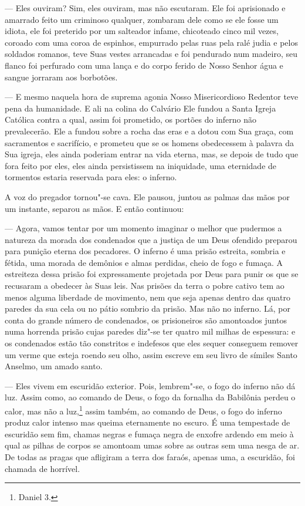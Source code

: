  --- Eles ouviram? Sim, eles ouviram, mas não escutaram. Ele foi
aprisionado e amarrado feito um criminoso qualquer, zombaram dele como
se ele fosse um idiota, ele foi preterido por um salteador infame,
chicoteado cinco mil vezes, coroado com uma coroa de espinhos,
empurrado pelas ruas pela ralé judia e pelos soldados romanos, teve
Suas vestes arrancadas e foi pendurado num madeiro, seu flanco foi
perfurado com uma lança e do corpo ferido de Nosso Senhor água e sangue
jorraram aos borbotões.

 --- E mesmo naquela hora de suprema agonia Nosso Misericordioso Redentor
 teve pena da humanidade. E ali na colina do Calvário Ele fundou a Santa
 Igreja Católica contra a qual, assim foi prometido, os portões do
inferno não prevalecerão. Ele a fundou sobre a rocha das eras e a dotou
com Sua graça, com sacramentos e sacrifício, e prometeu que se os
homens obedecessem à palavra da Sua igreja, eles ainda poderiam entrar
na vida eterna, mas, se depois de tudo que fora feito por eles, eles
ainda persistissem na iniquidade, uma eternidade de tormentos estaria
reservada para eles: o inferno.

A voz do pregador tornou"-se cava. Ele pausou, juntou as palmas das mãos
por um instante, separou as mãos. E então continuou:

 --- Agora, vamos tentar por um momento imaginar o melhor que pudermos a
natureza da morada dos condenados que a justiça de um Deus ofendido
preparou para punição eterna dos pecadores. O inferno é uma prisão
estreita, sombria e fétida, uma morada de demônios e almas perdidas,
cheio de fogo e fumaça. A estreiteza dessa prisão foi expressamente
projetada por Deus para punir os que se recusaram a obedecer às Suas
leis. Nas prisões da terra o pobre cativo tem ao menos alguma liberdade
de movimento, nem que seja apenas dentro das quatro paredes da sua cela
ou no pátio sombrio da prisão. Mas não no inferno. Lá, por conta do
grande número de condenados, os prisioneiros são amontoados juntos numa
horrenda prisão cujas paredes diz"-se ter quatro mil milhas de
espessura: e os condenados estão tão constritos e indefesos que eles
sequer conseguem remover um verme que esteja roendo seu olho, assim
escreve em seu livro de símiles Santo Anselmo, um amado santo.

 --- Eles vivem em escuridão exterior. Pois, lembrem"-se, o fogo do inferno
não dá luz. Assim como, ao comando de Deus, o fogo da fornalha da
Babilônia perdeu o calor, mas não a luz,\footnote{ Daniel 3.} assim
também, ao comando de Deus, o fogo do inferno produz calor intenso mas
queima eternamente no escuro. É uma tempestade de escuridão sem fim,
chamas negras e fumaça negra de enxofre ardendo em meio à qual as
pilhas de corpos se amontoam umas sobre as outras sem uma nesga de ar.
De todas as pragas que afligiram a terra dos faraós, apenas uma, a
escuridão, foi chamada de horrível.

